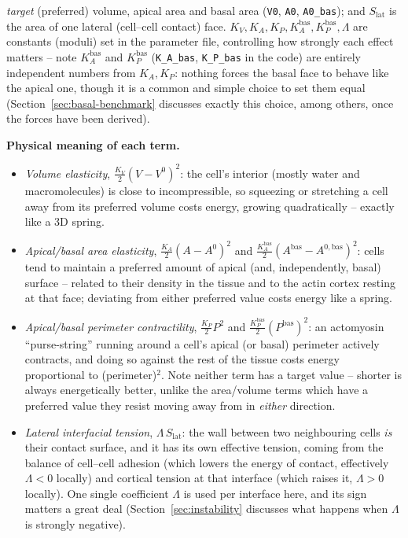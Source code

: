 \documentclass[11pt,a4paper]{report}
\begin{document}
\emph{target} (preferred) volume, apical area and basal area
(\texttt{V0}, \texttt{A0}, \texttt{A0\_bas}); and $S_{\mathrm{lat}}$ is
the area of one lateral (cell--cell contact) face. $K_V, K_A, K_P,
K_A^{\mathrm{bas}}, K_P^{\mathrm{bas}}, \Lambda$ are constants
(moduli) set in the parameter file, controlling how strongly each
effect matters -- note $K_A^{\mathrm{bas}}$ and $K_P^{\mathrm{bas}}$
(\texttt{K\_A\_bas}, \texttt{K\_P\_bas} in the code) are entirely
independent numbers from $K_A, K_P$: nothing forces the basal face to
behave like the apical one, though it is a common and simple choice to
set them equal (Section~\ref{sec:basal-benchmark} discusses exactly
this choice, among others, once the forces have been derived).

\begin{physbox}
\textbf{Physical meaning of each term.}
\begin{itemize}[leftmargin=1.4em]
  \item \emph{Volume elasticity}, $\tfrac{K_V}{2}(V-V^0)^2$: the cell's
  interior (mostly water and macromolecules) is close to
  incompressible, so squeezing or stretching a cell away from its
  preferred volume costs energy, growing quadratically -- exactly like
  a 3D spring.
  \item \emph{Apical/basal area elasticity}, $\tfrac{K_A}{2}(A-A^0)^2$
  and $\tfrac{K_A^{\mathrm{bas}}}{2}(A^{\mathrm{bas}}-A^{0,\mathrm{bas}})^2$:
  cells tend to maintain a preferred amount of apical (and,
  independently, basal) surface -- related to their density in the
  tissue and to the actin cortex resting at that face; deviating from
  either preferred value costs energy like a spring.
  \item \emph{Apical/basal perimeter contractility},
  $\tfrac{K_P}{2}P^2$ and $\tfrac{K_P^{\mathrm{bas}}}{2}(P^{\mathrm{bas}})^2$:
  an actomyosin ``purse-string'' running around a cell's apical (or
  basal) perimeter actively contracts, and doing so against the rest
  of the tissue costs energy proportional to (perimeter)$^2$. Note
  neither term has a target value -- shorter is always energetically
  better, unlike the area/volume terms which have a preferred value
  they resist moving away from in \emph{either} direction.
  \item \emph{Lateral interfacial tension}, $\Lambda\, S_{\mathrm{lat}}$:
  the wall between two neighbouring cells \emph{is} their contact
  surface, and it has its own effective tension, coming from the
  balance of cell--cell adhesion (which lowers the energy of contact,
  effectively $\Lambda<0$ locally) and cortical tension at that
  interface (which raises it, $\Lambda>0$ locally). One single
  coefficient $\Lambda$ is used per interface here, and its sign
  matters a great deal (Section~\ref{sec:instability} discusses what
  happens when $\Lambda$ is strongly negative).
\end{itemize}
\end{physbox}
\end{document}
